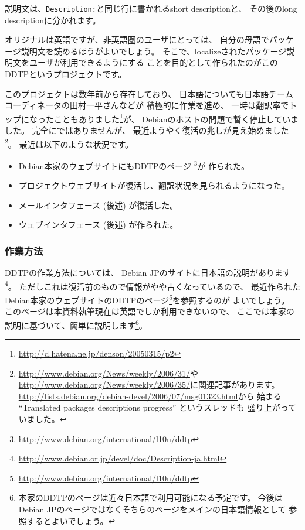 \documentclass[mingoth,a4paper]{jsarticle}
\begin{document}
説明文は、\verb|Description:|と同じ行に書かれるshort descriptionと、
その後のlong descriptionに分かれます。

オリジナルは英語ですが、非英語圏のユーザにとっては、
自分の母語でパッケージ説明文を読めるほうがよいでしょう。
そこで、localizeされたパッケージ説明文をユーザが利用できるようにする
ことを目的として作られたのがこのDDTPというプロジェクトです。

このプロジェクトは数年前から存在しており、
日本語についても日本語チームコーディネータの田村一平さんなどが
積極的に作業を進め、
一時は翻訳率でトップになったこともありました\footnote{%
\url{http://d.hatena.ne.jp/denson/20050315/p2}}が、
Debianのホストの問題で暫く停止していました。
完全にではありませんが、
最近ようやく復活の兆しが見え始めました\footnote{%
\url{http://www.debian.org/News/weekly/2006/31/}や
\url{http://www.debian.org/News/weekly/2006/35/}に関連記事があります。
\url{http://lists.debian.org/debian-devel/2006/07/msg01323.html}から
始まる ``Translated packages descriptions progress'' というスレッドも
盛り上がっていました。}。
最近は以下のような状況です。
\begin{itemize}
 \item Debian本家のウェブサイトにもDDTPのページ
       \footnote{\url{http://www.debian.org/international/l10n/ddtp}}が
       作られた。
 \item プロジェクトウェブサイトが復活し、翻訳状況を見られるようになった。
 \item メールインタフェース (後述) が復活した。
 \item ウェブインタフェース (後述) が作られた。
\end{itemize}

\subsubsection{作業方法}

DDTPの作業方法については、
Debian JPのサイトに日本語の説明があります\footnote{%
\url{http://www.debian.or.jp/devel/doc/Description-ja.html}}。
ただしこれは復活前のもので情報がやや古くなっているので、
最近作られたDebian本家のウェブサイトのDDTPのページ\footnote{%
\url{http://www.debian.org/international/l10n/ddtp}}を参照するのが
よいでしょう。
このページは本資料執筆現在は英語でしか利用できないので、
ここでは本家の説明に基づいて、簡単に説明します\footnote{%
本家のDDTPのページは近々日本語で利用可能になる予定です。
今後はDebian JPのページではなくそちらのページをメインの日本語情報として
参照するとよいでしょう。}。
\end{document}
